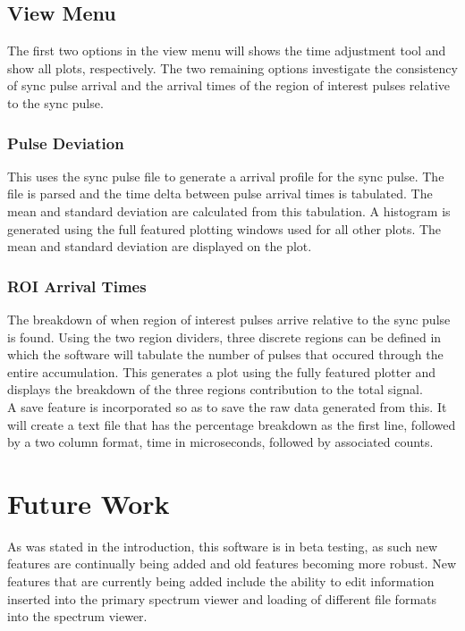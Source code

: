 \subsection{View Menu}
The first two options in the view menu will shows the time adjustment tool and show all plots, respectively. The two remaining options investigate the consistency of sync pulse arrival and the arrival times of the region of interest pulses relative to the sync pulse. 

\subsubsection{Pulse Deviation}
This uses the sync pulse file to generate a arrival profile for the sync pulse. The file is parsed and the time delta between pulse arrival times is tabulated. The mean and standard deviation are calculated from this tabulation. A histogram is generated using the full featured plotting windows used for all other plots. The mean and standard deviation are displayed on the plot. 

\subsubsection{ROI Arrival Times}
The breakdown of when region of interest pulses arrive relative to the sync pulse is found. Using the two region dividers, three discrete regions can be defined in which the software will tabulate the number of pulses that occured through the entire accumulation. This generates a plot using the fully featured plotter and displays the breakdown of the three regions contribution to the total signal. \\

A save feature is incorporated so as to save the raw data generated from this. It will create a text file that has the percentage breakdown as the first line, followed by a two column format, time in microseconds, followed by associated counts. 

\section{Future Work}
As was stated in the introduction, this software is in beta testing, as such new features are continually being added and old features becoming more robust. New features that are currently being added include the ability to edit information inserted into the primary spectrum viewer and loading of different file formats into the spectrum viewer. 